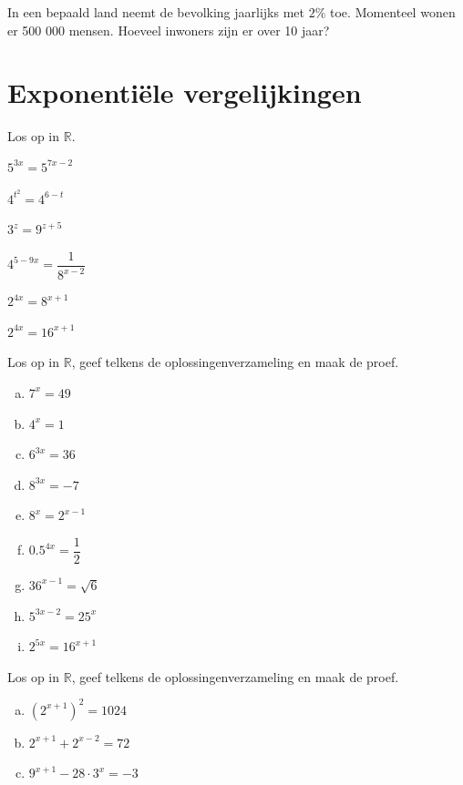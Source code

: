 \documentclass[12pt,twoside]{article}
\begin{document}
\begin{oefening}
In een bepaald land neemt de bevolking jaarlijks met $2\%$ toe. Momenteel wonen er 500 000 mensen. Hoeveel inwoners zijn er over 10 jaar?
\end{oefening}

\pagebreak
\section{Exponentiële vergelijkingen}

\begin{oefening}
Los op in $\mathbb{R}$.
\begin{exlist}{3}
  \item $5^{3x}=5^{7x-2}$
  \item $4^{t^2}=4^{6-t}$
  \item $3^z=9^{z+5}$
  \item $4^{5-9x}=\dfrac{1}{8^{x-2}}$
  \item $2^{4x}=8^{x+1}$
  \item $2^{4x}=16^{x+1}$
\end{exlist}
\end{oefening}


\begin{oefening}
Los op in $\mathbb{R}$, geef telkens de oplossingenverzameling en maak de proef.
\begin{multicols}{3}
\begin{enumerate}[(a)]
  \itemsep.5em
  \item $7^x=49$
  \item $4^x=1$
  \item $6^{3x}=36$
  \item $8^{3x}=-7$
  \item $8^x=2^{x-1}$
  \item $0.5^{4x}=\dfrac{1}{2}$
  \item $36^{x-1}=\sqrt{6}$
  \item $5^{3x-2}=25^x$
  \item $2^{5x}=16^{x+1}$
\end{enumerate}
\end{multicols}
\end{oefening}

\begin{oefening}
Los op in $\mathbb{R}$, geef telkens de oplossingenverzameling en maak de proef.
\begin{multicols}{3}
\begin{enumerate}[(a)]
  \itemsep.5em
  \item $\left(2^{x+1}\right)^2=1024$
  \item $2^{x+1}+2^{x-2}=72$
  \item $9^{x+1}-28\cdot 3^x=-3$
\end{enumerate}
\end{multicols}
\end{oefening}
\end{document}
